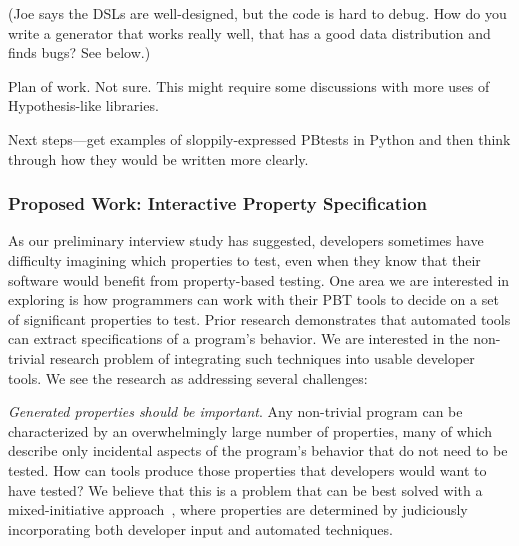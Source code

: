 (Joe says the DSLs are well-designed, but the code is hard to debug. How do you
write a generator that works really well, that has a good data distribution and
finds bugs? See below.)

Plan of work. Not sure. This might require some discussions with more uses of
Hypothesis-like libraries.

Next steps—get examples of sloppily-expressed PBtests in Python and then think
through how they would be written more clearly.

\subsubsection{Proposed Work: Interactive Property Specification}

 

As our preliminary interview study has suggested, developers sometimes have
difficulty imagining which properties to test, even when they know that their
software would benefit from property-based testing. One area we are interested
in exploring is how programmers can work with their PBT tools to decide on a set
of significant properties to test.  Prior research demonstrates that automated
tools can extract specifications of a program's
behavior\cite{ammons2002mining,le2018deep,claessen2010quickspec}. We are
interested in the non-trivial research problem of integrating such techniques
into usable developer tools. We see the research as addressing several
challenges:

\textit{Generated properties should be \emph{important}}. Any non-trivial
program can be characterized by an overwhelmingly large number of properties,
many of which describe only incidental aspects of the program's behavior that do
not need to be tested. How can tools produce those properties that developers
would want to have tested? We believe that this is a problem that can be best
solved with a mixed-initiative approach~\cite{allen1999mixed}, where properties
are determined by judiciously incorporating both developer input and automated
techniques.

